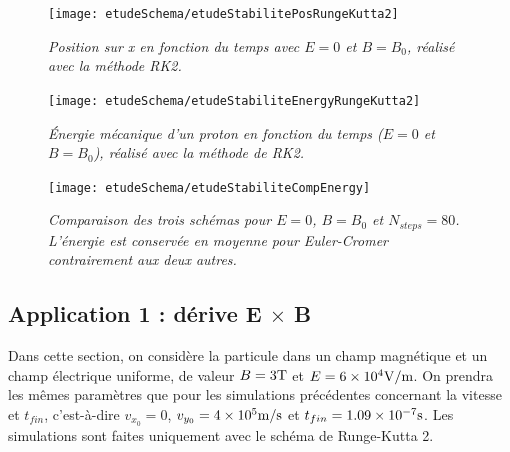 \documentclass[a4paper,12pt,oneside]{article}
\begin{document}
\begin{figure}[H]
\centerline{\texttt{[image: etudeSchema/etudeStabilitePosRungeKutta2]}}
\caption{ \label{etudeStabilitePosRungeKutta2}\em
 Position sur x en fonction du temps avec $E=0$ et $B=B_0$, réalisé avec la méthode RK2.
}
\end{figure}
\begin{figure}[H]
\centerline{\texttt{[image: etudeSchema/etudeStabiliteEnergyRungeKutta2]}}
\caption{ \label{etudeStabiliteEnergyRungeKutta2}\em
Énergie mécanique d'un proton en fonction du temps ($E=0$ et $B=B_0$), réalisé avec la méthode de RK2.
}
\end{figure}
\begin{figure}[H]
\centerline{\texttt{[image: etudeSchema/etudeStabiliteCompEnergy]}}
\caption{ \label{etudeStabiliteCompEnergy}\em
Comparaison des trois schémas pour $E=0$, $B=B_0$ et $N_{steps}=80$. L'énergie est conservée en moyenne pour Euler-Cromer contrairement aux deux autres.
}
\end{figure}


\newpage
\subsection{Application 1 : dérive E $\times$ B}
Dans cette section, on considère la particule dans un champ magnétique et un champ électrique uniforme, de valeur $B=3 \rm T$ et $E=6\times10^4 \rm V/m$. On prendra les mêmes paramètres que pour les simulations précédentes concernant la vitesse et $t_{fin}$, c'est-à-dire $v_{x_0}=0$, $v_{y_0}=4\times 10^{5} \rm  m/s$ et $t_{fin}=1.09 \times 10^{-7} \rm s$. Les simulations sont faites uniquement avec le schéma de Runge-Kutta 2.
\end{document}
